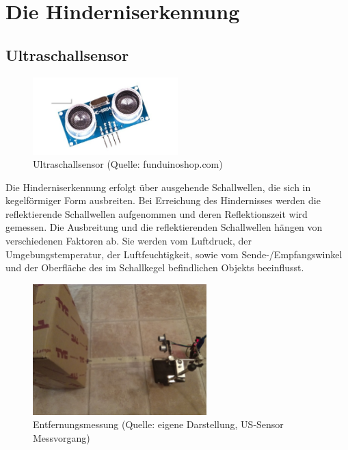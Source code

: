 \newpage
\renewcommand{\autoren}{Valentyn Chepil}

\section{Die Hinderniserkennung}
\subsection{Ultraschallsensor}

\begin{figure}[!h]  %
	\centering\includegraphics[width=0.5\textwidth]{images/Bild-1-1.png}
	\caption{Ultraschallsensor \newline(Quelle: funduinoshop.com)}
	\label{bild_1.1} %
\end{figure}

Die Hinderniserkennung erfolgt über ausgehende Schallwellen, die sich in kegelförmiger Form  ausbreiten. Bei Erreichung des Hindernisses werden die reflektierende Schallwellen aufgenommen und deren Reflektionszeit wird gemessen. Die Ausbreitung und die reflektierenden Schallwellen hängen von verschiedenen Faktoren ab. Sie werden vom Luftdruck, der Umgebungstemperatur, der Luftfeuchtigkeit, sowie vom Sende-/Empfangswinkel und der Oberfläche des im Schallkegel befindlichen Objekts beeinflusst.


\begin{figure}[!h]  %
	\centering\includegraphics[width=0.6\textwidth]{images/Bild-1.jpg}
	\caption{Entfernungsmessung \newline (Quelle: eigene Darstellung, US-Sensor Messvorgang)}
	\label{bild_1} %
\end{figure}

